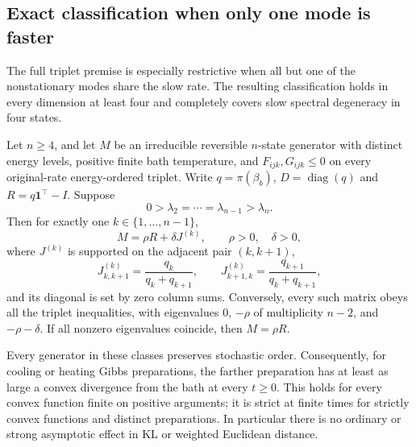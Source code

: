 \subsection{Exact classification when only one mode is faster}
\label{sec:fulltripletdegenerate}
The full triplet premise is especially restrictive when all but one of
the nonstationary modes share the slow rate. The resulting classification
holds in every dimension at least four and completely covers slow
spectral degeneracy in four states.

\begin{theorem}
\label{thm:tripletdegenerate}
Let $n\geq4$, and let $M$ be an irreducible reversible $n$-state generator
with distinct energy levels, positive finite bath temperature, and
$F_{ijk},G_{ijk}\leq0$ on every original-rate energy-ordered triplet.
Write $q=\pi(\beta_b)$, $D=\operatorname{diag}(q)$ and
$R=q\mathbf1^\top-I$. Suppose
\[
0>\lambda_2=\cdots=\lambda_{n-1}>\lambda_n.
\]
Then for exactly one $k\in\{1,\ldots,n-1\}$,
\[
M=\rho R+\delta J^{(k)},\qquad \rho>0,\quad\delta>0,
\]
where $J^{(k)}$ is supported on the adjacent pair $(k,k+1)$,
\[
J^{(k)}_{k,k+1}=\frac{q_k}{q_k+q_{k+1}},\qquad
J^{(k)}_{k+1,k}=\frac{q_{k+1}}{q_k+q_{k+1}},
\]
and its diagonal is set by zero column sums. Conversely, every such
matrix obeys all the triplet inequalities, with eigenvalues $0$,
$-\rho$ of multiplicity $n-2$, and $-\rho-\delta$.
If all nonzero eigenvalues coincide, then $M=\rho R$.

Every generator in these classes preserves stochastic order.
Consequently, for cooling or heating Gibbs preparations, the farther
preparation has at least as large a convex divergence from the bath at
every $t\geq0$. This holds for every convex function finite on positive
arguments; it is strict at finite times for strictly convex functions
and distinct preparations. In particular there is no ordinary or strong
asymptotic effect in KL or weighted Euclidean distance.
\end{theorem}
